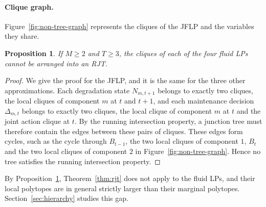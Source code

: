 \documentclass{article}
\newtheorem{proposition}{Proposition}
\begin{document}
\paragraph{Clique graph.}
Figure~\ref{fig:non-tree-graph} represents the cliques of the JFLP and the variables they share.

\begin{proposition}\label{prop:no-rjt}
If $M \ge 2$ and $T \ge 3$, the cliques of each of the four fluid LPs cannot be arranged into an RJT.
\end{proposition}
\begin{proof}
We give the proof for the JFLP, and it is the same for the three other approximations. Each degradation state
$N_{m,t+1}$ belongs to exactly two cliques, the local cliques of component $m$ at $t$ and $t+1$, and each maintenance
decision $\Delta_{m,t}$ belongs to exactly two cliques, the local clique of component $m$ at $t$ and the joint action
clique at $t$. By the running intersection property, a junction tree must therefore contain the edges between these
pairs of cliques. These edges form cycles, such as the cycle through $B_{t-1}$, the two local cliques of component $1$,
$B_t$ and the two local cliques of component $2$ in Figure~\ref{fig:non-tree-graph}. Hence no tree satisfies the running
intersection property.
\end{proof}

By Proposition~\ref{prop:no-rjt}, Theorem~\ref{thm:rjt} does not apply to the fluid LPs, and their local polytopes are
in general strictly larger than their marginal polytopes. Section~\ref{sec:hierarchy} studies this gap.
\end{document}
